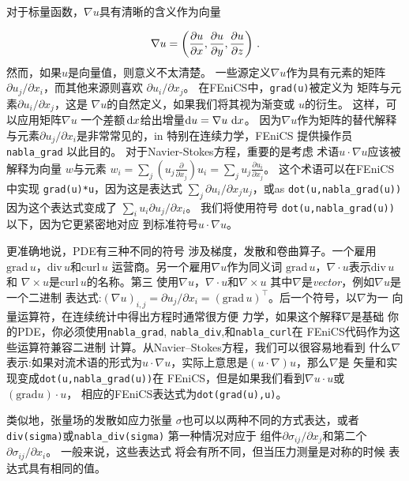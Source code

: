 \begin{notice}
对于标量函数，$\nabla u$具有清晰的含义作为向量

\[ \nabla u =\left(\frac{\partial u}{\partial x}, \frac{\partial u}{\partial y},
\frac{\partial u}{\partial z}\right)\thinspace .\]
然而，如果$u$是向量值，则意义不太清楚。
一些源定义$\nabla u$作为具有元素的矩阵
$\partial u_j / \partial x_i$，而其他来源则喜欢
$\partial u_i / \partial x_j$。 在FEniCS中，\texttt{grad(u)}被定义为
矩阵与元素$\partial u_i / \partial x_j$，这是
$\nabla u$的自然定义，如果我们将其视为渐变或
$u$的衍生。 这样，可以应用矩阵$\nabla u$
一个差额$\, \mathrm{d}x$给出增量$\mathrm{d}u = \nabla u \,
\, \mathrm{d}x$。 因为$\nabla u$作为矩阵的替代解释
与元素$\partial u_j / \partial x_i$是非常常见的，in
特别在连续力学，FEniCS
提供操作员\verb!nabla_grad! 以此目的。
对于Navier-Stokes方程，重要的是考虑
术语$u \cdot \nabla u $应该被解释为向量
$w$与元素
$w_i = \sum_j \left(u_j \frac{\partial}{\partial x_j}\right) u_i
= \sum_j u_j \frac{\partial u_i}{\partial x_j}$。
这个术语可以在FEniCS中实现
\texttt{grad(u)*u}，因为这是表达式
$\sum_j \partial u_i / \partial x_j u_j$，或as
\verb!dot(u,nabla_grad(u))! 因为这个表达式变成了
$\sum_i u_i \partial u_j / \partial x_i$。 我们将使用符号
\verb!dot(u,nabla_grad(u))! 以下，因为它更紧密地对应
到标准符号$u \cdot \nabla u$。

更准确地说，PDE有三种不同的符号
涉及梯度，发散和卷曲算子。一个雇用
$\mathrm{grad}\, u$，$\mathrm{div}\, u$和$\mathrm{curl}\, u$
运营商。另一个雇用$\nabla u$作为同义词
$\mathrm{grad}\, u$，$\nabla\cdot u$表示$\mathrm{div}\, u$和
$\nabla\times u$是$\mathrm{curl}\, u$的名称。第三
使用$\nabla u$，$\nabla\cdot u$和$\nabla\times u$
其中$\nabla$是\emph{vector}，例如$\nabla u$是一个二进制
表达式:$(\nabla u)_{i,j} = \partial u_j/\partial x_i =
(\mathrm{grad}\,u)^{\top}$。后一个符号，以$\nabla$为一
向量运算符，在连续统计中得出方程时通常很方便
力学，如果这个解释$\nabla$是基础
你的PDE，你必须使用\verb!nabla_grad!, \verb!nabla_div!,和\verb!nabla_curl!在
FEniCS代码作为这些运算符兼容二进制
计算。从Navier--Stokes方程，我们可以很容易地看到
什么$\nabla$表示:如果对流术语的形式为$u \cdot
\nabla u$，实际上意思是$(u \cdot\nabla)u$，那么$\nabla$是
矢量和实现变成\verb!dot(u,nabla_grad(u))!在
FEniCS，但是如果我们看到$\nabla u\cdot u$或$(\mathrm{grad}u)\cdot u$，
相应的FEniCS表达式为\texttt{dot(grad(u),u)}。

类似地，张量场的发散如应力张量
$\sigma$也可以以两种不同的方式表达，或者
\texttt{div(sigma)}或\verb!nabla_div(sigma)! 第一种情况对应于
组件$\partial \sigma_ {ij}/{\partial x_j}$和第二个
$\partial \sigma_ {ij}/{\partial x_i}$。 一般来说，这些表达式
将会有所不同，但当压力测量是对称的时候
表达式具有相同的值。
\end{notice}

